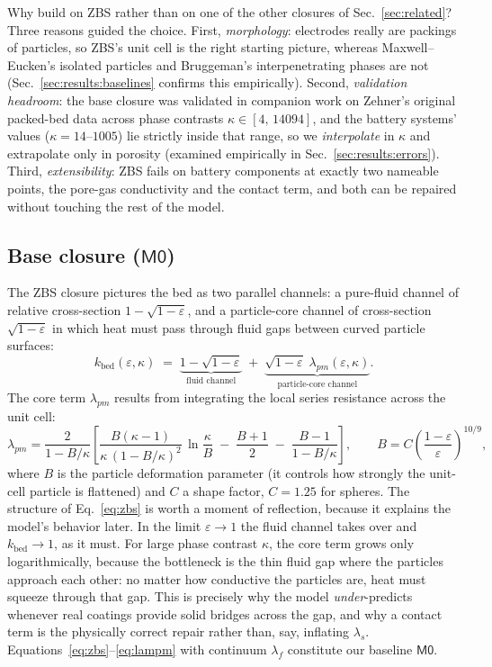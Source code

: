 \documentclass[10pt,a4paper]{article}
\newcommand{\lams}{\lambda_{s}}
\newcommand{\lamf}{\lambda_{f}}
\newcommand{\Mzero}{\ensuremath{\mathsf{M0}}}
\begin{document}
Why build on ZBS rather than on one of the other closures of Sec.~\ref{sec:related}? Three reasons guided the choice. First, \emph{morphology}: electrodes really are packings of particles, so ZBS's unit cell is the right starting picture, whereas Maxwell--Eucken's isolated particles and Bruggeman's interpenetrating phases are not (Sec.~\ref{sec:results:baselines} confirms this empirically). Second, \emph{validation headroom}: the base closure was validated in companion work on Zehner's original packed-bed data across phase contrasts $\kappa\in[4,\,14094]$, and the battery systems' values ($\kappa=14$--$1005$) lie strictly inside that range, so we \emph{interpolate} in $\kappa$ and extrapolate only in porosity (examined empirically in Sec.~\ref{sec:results:errors}). Third, \emph{extensibility}: ZBS fails on battery components at exactly two nameable points, the pore-gas conductivity and the contact term, and both can be repaired without touching the rest of the model.

\subsection{Base closure (\Mzero)}
\label{sec:model:zbs}

The ZBS closure \cite{zehner1970,bauer1978,vdi} pictures the bed as two parallel channels: a pure-fluid channel of relative cross-section $1-\sqrt{1-\varepsilon}$, and a particle-core channel of cross-section $\sqrt{1-\varepsilon}$ in which heat must pass through fluid gaps between curved particle surfaces:
\begin{equation}
k_{\mathrm{bed}}(\varepsilon,\kappa) \;=\; \underbrace{1-\sqrt{1-\varepsilon}}_{\text{fluid channel}} \;+\; \underbrace{\sqrt{1-\varepsilon}\;\lambda_{pm}(\varepsilon,\kappa)}_{\text{particle-core channel}} .
\label{eq:zbs}
\end{equation}
The core term $\lambda_{pm}$ results from integrating the local series resistance across the unit cell:
\begin{equation}
\lambda_{pm}=\frac{2}{1-B/\kappa}\!\left[\frac{B(\kappa-1)}{\kappa\,(1-B/\kappa)^{2}}\,\ln\frac{\kappa}{B}\;-\;\frac{B+1}{2}\;-\;\frac{B-1}{1-B/\kappa}\right],
\qquad
B = C\left(\frac{1-\varepsilon}{\varepsilon}\right)^{10/9},
\label{eq:lampm}
\end{equation}
where $B$ is the particle deformation parameter (it controls how strongly the unit-cell particle is flattened) and $C$ a shape factor, $C=1.25$ for spheres. The structure of Eq.~\eqref{eq:zbs} is worth a moment of reflection, because it explains the model's behavior later. In the limit $\varepsilon\to1$ the fluid channel takes over and $k_{\mathrm{bed}}\to1$, as it must. For large phase contrast $\kappa$, the core term grows only logarithmically, because the bottleneck is the thin fluid gap where the particles approach each other: no matter how conductive the particles are, heat must squeeze through that gap. This is precisely why the model \emph{under}-predicts whenever real coatings provide solid bridges across the gap, and why a contact term is the physically correct repair rather than, say, inflating $\lams$. Equations~\eqref{eq:zbs}--\eqref{eq:lampm} with continuum $\lamf$ constitute our baseline \Mzero{}.
\end{document}
